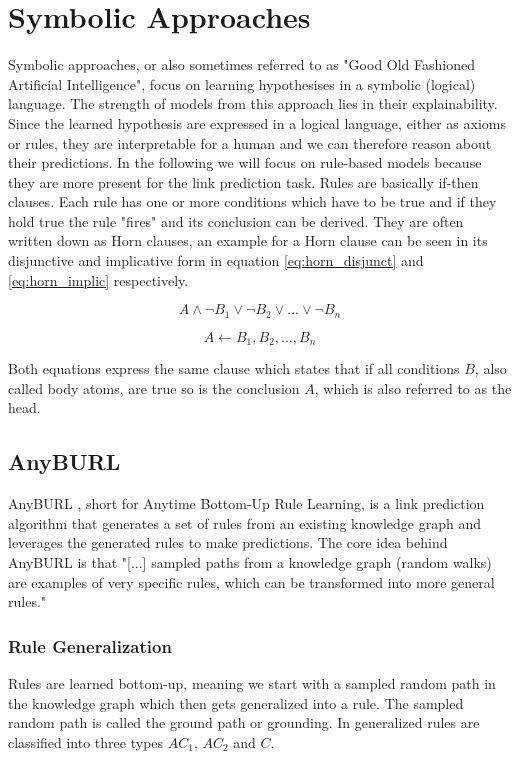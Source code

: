 \section{Symbolic Approaches}
\label{cha:symbolic_methods}
Symbolic approaches, or also sometimes referred to as "Good Old Fashioned Artificial Intelligence", focus on learning hypothesises in a symbolic (logical) language. \cite{hogan_knowledge_2021} The strength of models from this approach lies in their explainability. Since the learned hypothesis are expressed in a logical language, either as axioms or rules, they are interpretable for a human and we can therefore reason about their predictions. In the following we will focus on rule-based models because they are more present for the link prediction task.  \cite{hatzilygeroudis_neuro-symbolic_2005} 
Rules are basically if-then clauses. Each rule has one or more conditions which have to be true and if they hold true the rule "fires" and its conclusion can be derived. They are often written down as Horn clauses, an example for a Horn clause can be seen in its disjunctive and implicative form in equation \ref{eq:horn_disjunct} and \ref{eq:horn_implic} respectively. \cite{chandra_horn_1985}

\begin{equation}
\label{eq:horn_disjunct}
A \wedge \neg B_1 \vee \neg B_2 \vee ... \vee \neg B_n \end{equation}

\begin{equation}
\label{eq:horn_implic}
A \leftarrow B_1, B_2, ..., B_n
\end{equation}

Both equations express the same clause which states that if all conditions $B$, also called body atoms, are true so is the conclusion $A$, which is also referred to as the head.

\subsection{AnyBURL}
\label{cha:anyburl}
AnyBURL \cite{meilicke_anytime_2019}, short for Anytime Bottom-Up Rule Learning, is a link prediction algorithm that generates a set of rules from an existing knowledge graph and leverages the generated rules to make predictions. The core idea behind AnyBURL  is that "[...] sampled paths from a knowledge graph (random walks) are examples of very specific rules, which can be transformed into more general rules." \cite{ott_safran_2021} 

\subsubsection{Rule Generalization}
\label{cha:anyburl_generalization}
Rules are learned bottom-up, meaning we start with a sampled random path in the knowledge graph which then gets generalized into a rule. The sampled random path is called the ground path or grounding. In \cite{meilicke_anytime_2019} generalized rules are classified into three types $AC_1$, $AC_2$ and $C$. 

